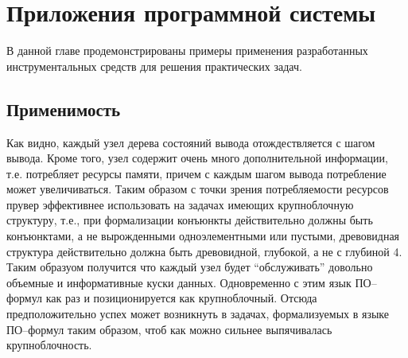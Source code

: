 \chapter{Приложения программной системы}
\label{part:examples}

В данной главе продемонстрированы примеры применения разработанных инструментальных средств  для решения практических задач. %

\section{Применимость}
Как видно, каждый узел дерева состояний вывода отождествляется с шагом вывода. Кроме того, узел содержит очень много дополнительной информации, т.е. потребляет ресурсы памяти, причем с каждым шагом вывода потребление может увеличиваться. Таким образом с точки зрения потребляемости ресурсов прувер эффективнее использовать на задачах имеющих крупноблочную структуру, т.е., при формализации конъюнкты действительно должны быть конъюнктами, а не вырожденными одноэлементными или пустыми, древовидная структура действительно должна быть древовидной, глубокой, а не с глубиной 4. Таким образуом получится что каждый узел будет “обслуживать” довольно объемные и информативные куски данных. Одновременно с этим язык ПО--формул как раз и позиционируется как крупноблочный. Отсюда предположительно успех может возникнуть в задачах, формализуемых в языке ПО--формул таким образом, чтоб как можно сильнее выпячивалась крупноблочность. %





